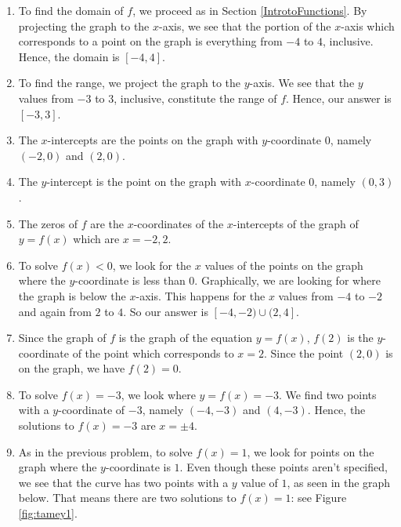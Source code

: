 {
\begin{enumerate}

\item  To find the domain of $f$, we proceed as in Section \ref{IntrotoFunctions}.  By projecting the graph to the $x$-axis, we see that the portion of the $x$-axis which corresponds to a point on the graph is everything from $-4$ to $4$, inclusive.  Hence, the domain is $[-4,4]$.

\item  To find the range, we project the graph to the $y$-axis.  We see that the $y$ values from $-3$ to $3$, inclusive, constitute the range of $f$.  Hence, our answer is $[-3,3]$.

\item  The $x$-intercepts are the points on the graph with $y$-coordinate $0$, namely $(-2,0)$ and $(2,0)$.

\item  The $y$-intercept is the point on the graph with $x$-coordinate $0$, namely $(0,3)$.

\item  The zeros of $f$ are the $x$-coordinates of the $x$-intercepts of the graph of $y=f(x)$ which are $x=-2, 2$.

\item  To solve $f(x) < 0$, we look for the $x$ values of the points on the graph where the $y$-coordinate is less than $0$.  Graphically, we are looking for where the graph is below the $x$-axis.  This happens for the $x$ values from $-4$ to $-2$ and again from $2$ to $4$.  So our answer is $[-4,-2) \cup (2,4]$.

\item  Since the graph of $f$ is the graph of the equation $y=f(x)$, $f(2)$ is the $y$-coordinate of the point which corresponds to $x = 2$.  Since the point $(2,0)$ is on the graph, we have $f(2) = 0$.

\item  To solve $f(x) = -3$, we look where $y = f(x) = -3$.  We find two points with a $y$-coordinate of $-3$, namely $(-4,-3)$ and $(4,-3)$.  Hence, the solutions to $f(x) = -3$ are $x = \pm 4$.

\item As in the previous problem, to solve $f(x)=1$, we look for points on the graph where the $y$-coordinate is $1$.  Even though these points aren't specified, we see that the curve has two points with a $y$ value of $1$, as seen in the graph below.  That means there are two solutions to $f(x) = 1$: see Figure \ref{fig:tamey1}.


\end{enumerate}}
